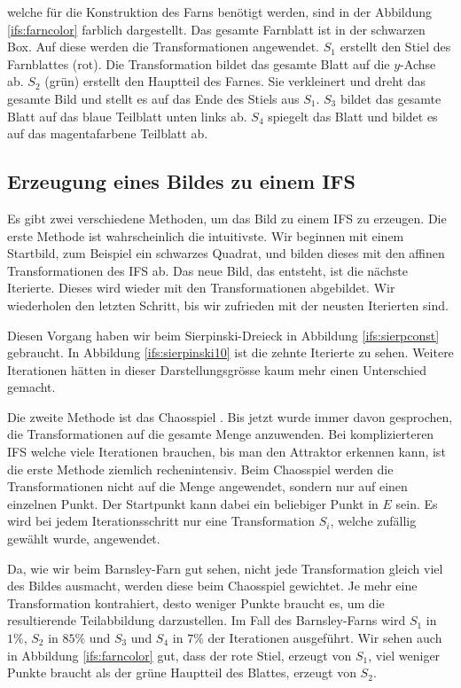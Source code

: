welche für die Konstruktion des Farns benötigt werden, sind in der Abbildung \ref{ifs:farncolor} farblich dargestellt.
Das gesamte Farnblatt ist in der schwarzen Box.
Auf diese werden die Transformationen angewendet.
$S_1$ erstellt den Stiel des Farnblattes (rot).
Die Transformation bildet das gesamte Blatt auf die $y$-Achse ab.
$S_2$ (grün) erstellt den Hauptteil des Farnes. 
Sie verkleinert und dreht das gesamte Bild und stellt es auf das Ende des Stiels aus $S_1$.
$S_3$ bildet das gesamte Blatt auf das blaue Teilblatt unten links ab.
$S_4$ spiegelt das Blatt und bildet es auf das magentafarbene Teilblatt ab.  
\subsection{Erzeugung eines Bildes zu einem IFS}
Es gibt zwei verschiedene Methoden, um das Bild zu einem IFS zu erzeugen.
Die erste Methode ist wahrscheinlich die intuitivste. 
Wir beginnen mit einem Startbild, zum Beispiel ein schwarzes Quadrat, und bilden dieses mit den affinen Transformationen des IFS ab.
Das neue Bild, das entsteht, ist die nächste Iterierte.
Dieses wird wieder mit den Transformationen abgebildet.
Wir wiederholen den letzten Schritt, bis wir zufrieden mit der neusten Iterierten sind.

Diesen Vorgang haben wir beim Sierpinski-Dreieck in Abbildung \ref{ifs:sierpconst} gebraucht.
In Abbildung \ref{ifs:sierpinski10} ist die zehnte Iterierte zu sehen.
Weitere Iterationen hätten in dieser Darstellungsgrösse kaum mehr einen Unterschied gemacht.


Die zweite Methode ist das Chaosspiel \cite{ifs:chaos}. 
%
Bis jetzt wurde immer davon gesprochen, die Transformationen auf die gesamte Menge anzuwenden.
Bei komplizierteren IFS welche viele Iterationen brauchen, bis man den Attraktor erkennen kann, ist die erste Methode ziemlich rechenintensiv.
Beim Chaosspiel werden die Transformationen nicht auf die Menge angewendet, sondern nur auf einen einzelnen Punkt.
Der Startpunkt kann dabei ein beliebiger Punkt in $E$ sein.
Es wird bei jedem Iterationsschritt nur eine Transformation $S_i$, welche zufällig gewählt wurde, angewendet.

Da, wie wir beim Barnsley-Farn gut sehen, nicht jede Transformation gleich viel des Bildes ausmacht, werden diese beim Chaosspiel gewichtet.
Je mehr eine Transformation kontrahiert, desto weniger Punkte braucht es, um die resultierende Teilabbildung darzustellen.
Im Fall des Barnsley-Farns wird $S_1$ in $1\%$, $S_2$ in $85\%$ und $S_3$ und $S_4$ in $7\%$ der Iterationen ausgeführt.
Wir sehen auch in Abbildung \ref{ifs:farncolor} gut, dass der rote Stiel, erzeugt von $S_1$, viel weniger Punkte braucht als der grüne Hauptteil des Blattes, erzeugt von $S_2$.

